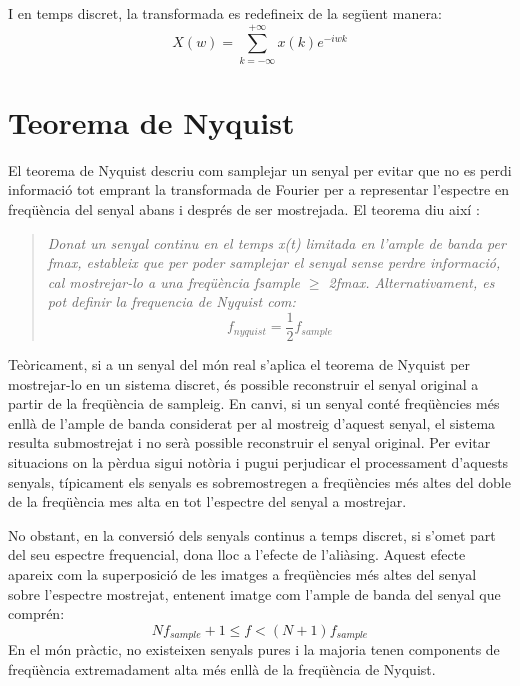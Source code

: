 \par I en temps discret, la transformada es redefineix de la següent manera\cite{ImmAudioSign}:
\begin{equation}\label{eqDiscreteFourier}
    X(w) = \sum_{k =-\infty}^{+\infty} x(k)e^{-iwk}
\end{equation}

\section{Teorema de Nyquist}
\par El teorema de Nyquist descriu com samplejar un senyal per evitar que no es perdi informació tot emprant la transformada de Fourier per a representar l'espectre en freqüència del senyal abans i després de ser mostrejada. El teorema diu així \cite{NYQUIST1928}:
\begin{quote}
    \textit{Donat un senyal continu en el temps x(t) limitada en l'ample de banda per fmax, estableix que per poder samplejar el senyal sense perdre informació, cal mostrejar-lo a una freqüència fsample $\geq$ 2fmax. Alternativament, es pot definir la frequencia de Nyquist com: \[f_{nyquist} = \frac{1}{2}f_{sample}\]}
\end{quote}
\par Teòricament, si a un senyal del món real s'aplica el teorema de Nyquist per mostrejar-lo en un sistema discret, és possible reconstruir el senyal original a partir de la freqüència de sampleig. En canvi, si un senyal conté freqüències més enllà de l'ample de banda considerat per al mostreig d'aquest senyal, el sistema resulta submostrejat i no serà possible reconstruir el senyal original. Per evitar situacions on la pèrdua sigui notòria i pugui perjudicar el processament d'aquests senyals, típicament els senyals es sobremostregen a freqüències més altes del doble de la freqüència mes alta en tot l'espectre del senyal a mostrejar.
\par No obstant, en la conversió dels senyals continus a temps discret, si s'omet part del seu espectre frequencial, dona lloc a l'efecte de l'aliàsing. Aquest efecte apareix com la superposició de les imatges a freqüències més altes del senyal sobre l'espectre mostrejat, entenent imatge com l'ample de banda del senyal que comprén: \[Nf_{sample} + 1 \leq f < (N+1)f_{sample}\] En el món pràctic, no existeixen senyals pures i la majoria tenen components de freqüència extremadament alta més enllà de la freqüència de Nyquist. 

